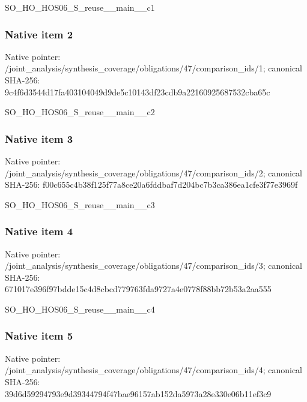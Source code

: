 \documentclass[10pt,a4paper]{article}
\begin{document}
\begingroup\raggedright\sloppy SO\_\allowbreak{}HO\_\allowbreak{}HOS06\_\allowbreak{}S\_\allowbreak{}reuse\_\allowbreak{}\_\allowbreak{}main\_\allowbreak{}\_\allowbreak{}c1\par\endgroup

\subsubsection{Native item 2}
Native pointer: /joint\_\allowbreak{}analysis/synthesis\_\allowbreak{}coverage/obligations/47/comparison\_\allowbreak{}ids/1; canonical SHA-256: 9c4f6d3544d17fa403104049d9de5c10143df23cdb9a22160925687532cba65c

\begingroup\raggedright\sloppy SO\_\allowbreak{}HO\_\allowbreak{}HOS06\_\allowbreak{}S\_\allowbreak{}reuse\_\allowbreak{}\_\allowbreak{}main\_\allowbreak{}\_\allowbreak{}c2\par\endgroup

\subsubsection{Native item 3}
Native pointer: /joint\_\allowbreak{}analysis/synthesis\_\allowbreak{}coverage/obligations/47/comparison\_\allowbreak{}ids/2; canonical SHA-256: f00c655c4b38f125f77a8ce20a6fddbaf7d204bc7b3ca386ea1cfe3f77e3969f

\begingroup\raggedright\sloppy SO\_\allowbreak{}HO\_\allowbreak{}HOS06\_\allowbreak{}S\_\allowbreak{}reuse\_\allowbreak{}\_\allowbreak{}main\_\allowbreak{}\_\allowbreak{}c3\par\endgroup

\subsubsection{Native item 4}
Native pointer: /joint\_\allowbreak{}analysis/synthesis\_\allowbreak{}coverage/obligations/47/comparison\_\allowbreak{}ids/3; canonical SHA-256: 671017e396f97bdde15c4d8cbcd779763fda9727a4e0778f88bb72b53a2aa555

\begingroup\raggedright\sloppy SO\_\allowbreak{}HO\_\allowbreak{}HOS06\_\allowbreak{}S\_\allowbreak{}reuse\_\allowbreak{}\_\allowbreak{}main\_\allowbreak{}\_\allowbreak{}c4\par\endgroup

\subsubsection{Native item 5}
Native pointer: /joint\_\allowbreak{}analysis/synthesis\_\allowbreak{}coverage/obligations/47/comparison\_\allowbreak{}ids/4; canonical SHA-256: 39d6d59294793e9d39344794f47bae96157ab152da5973a28e330e06b11ef3c9
\end{document}
